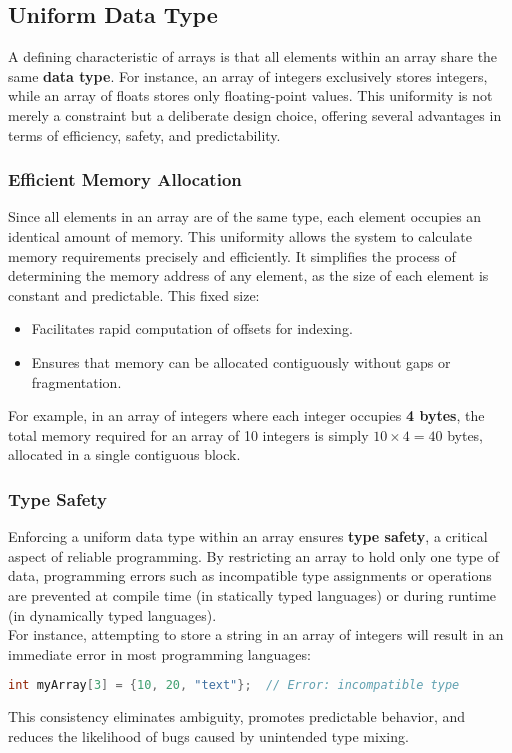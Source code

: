 \documentclass[12pt, oneside]{book}
\begin{document}
\subsection{Uniform Data Type}
A defining characteristic of arrays is that all elements within an array share the same \textbf{data type}. For instance, an array of integers exclusively stores integers, while an array of floats stores only floating-point values. This uniformity is not merely a constraint but a deliberate design choice, offering several advantages in terms of efficiency, safety, and predictability.

\subsubsection{Efficient Memory Allocation}
Since all elements in an array are of the same type, each element occupies an identical amount of memory. This uniformity allows the system to calculate memory requirements precisely and efficiently. It simplifies the process of determining the memory address of any element, as the size of each element is constant and predictable. This fixed size:
\begin{itemize}
	\item Facilitates rapid computation of offsets for indexing.
	\item  Ensures that memory can be allocated contiguously without gaps or fragmentation.
\end{itemize}
For example, in an array of integers where each integer occupies \textbf{4 bytes}, the total memory required for an array of 10 integers is simply \(10 \times 4 = 40\) bytes, allocated in a single contiguous block.
\subsubsection{Type Safety}
Enforcing a uniform data type within an array ensures \textbf{type safety}, a critical aspect of reliable programming. By restricting an array to hold only one type of data, programming errors such as incompatible type assignments or operations are prevented at compile time (in statically typed languages) or during runtime (in dynamically typed languages).\\
For instance, attempting to store a string in an array of integers will result in an immediate error in most programming languages:
\begin{lstlisting}[language=C]
	  int myArray[3] = {10, 20, "text"};  // Error: incompatible type
\end{lstlisting}
This consistency eliminates ambiguity, promotes predictable behavior, and reduces the likelihood of bugs caused by unintended type mixing.
\end{document}
